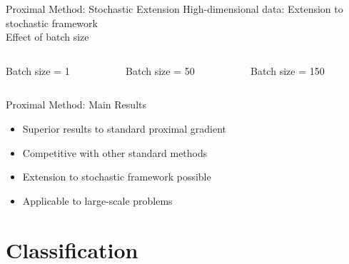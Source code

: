 \documentclass[10pt]{beamer}
\begin{document}
   \begin{frame}{Proximal Method: Stochastic Extension}
   High-dimensional data:
   Extension to stochastic framework\\
   \vspace{25pt}
   \centering\alert{Effect of batch size}
   	\begin{columns}[T]
   		\hspace{-16pt}
   		\begin{column}{.3\textwidth}
   			\hspace{30pt} \scriptsize Batch size = 1
   			\vspace{10pt}
   			\resizebox{1.18\linewidth}{!}{}
   		\end{column}\hspace{-16pt}
   		\begin{column}{.3\textwidth}
   			\hspace{30pt} \scriptsize Batch size = 50
   			\vspace{10pt}
   			\resizebox{1.18\linewidth}{!}{}
   		\end{column}\hspace{-16pt}
   		\begin{column}{.3\textwidth}
   			\hspace{30pt} \scriptsize Batch size = 150
   			\vspace{10pt}
   			\resizebox{1.18\linewidth}{!}{}
   		\end{column}
   	\end{columns}
   \end{frame}
   
   \begin{frame}{Proximal Method: Main Results}
   	\begin{itemize}
   		\item Superior results to standard proximal gradient
   		\item Competitive with other standard methods
   		\item Extension to stochastic framework possible
   		\item Applicable to large-scale problems
   	\end{itemize}
   \end{frame}

\section{Classification}
\end{document}
